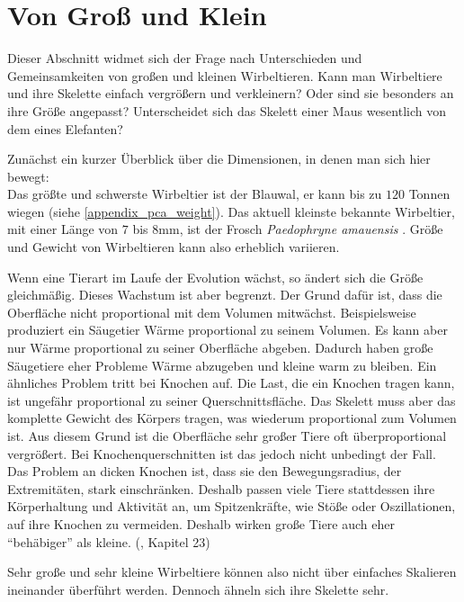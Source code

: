 \section{Von Groß und Klein}
\label{bigAndSmall}

Dieser Abschnitt widmet sich der Frage nach Unterschieden und Gemeinsamkeiten von großen und kleinen Wirbeltieren. Kann man Wirbeltiere und ihre Skelette einfach vergrößern und verkleinern? Oder sind sie besonders an ihre Größe angepasst? Unterscheidet sich das Skelett einer Maus wesentlich von dem eines Elefanten?

Zunächst ein kurzer Überblick über die Dimensionen, in denen man sich hier bewegt:\\
Das größte und schwerste Wirbeltier ist der Blauwal, er kann bis zu $120$ Tonnen wiegen (siehe \ref{appendix_pca_weight}). Das aktuell kleinste bekannte Wirbeltier, mit einer Länge von $7$ bis $8$mm, ist der Frosch \emph{Paedophryne amauensis} \cite{smallestVertebrate}. Größe und Gewicht von Wirbeltieren kann also erheblich variieren.

Wenn eine Tierart im Laufe der Evolution wächst, so ändert sich die Größe gleichmäßig. Dieses Wachstum ist aber begrenzt. Der Grund dafür ist, dass die Oberfläche nicht proportional mit dem Volumen mitwächst. Beispielsweise produziert ein Säugetier Wärme proportional zu seinem Volumen. Es kann aber nur Wärme proportional zu seiner Oberfläche abgeben. Dadurch haben große Säugetiere eher Probleme Wärme abzugeben und kleine warm zu bleiben.
Ein ähnliches Problem tritt bei Knochen auf. Die Last, die ein Knochen tragen kann, ist ungefähr proportional zu seiner Querschnittsfläche. Das Skelett muss aber das komplette Gewicht des Körpers tragen, was wiederum proportional zum Volumen ist.
Aus diesem Grund ist die Oberfläche sehr großer Tiere oft überproportional vergrößert.  Bei Knochenquerschnitten ist das jedoch nicht unbedingt der Fall. Das Problem an dicken Knochen ist, dass sie den Bewegungsradius, \zb der Extremitäten, stark einschränken. Deshalb passen viele Tiere stattdessen ihre Körperhaltung und Aktivität an, um Spitzenkräfte, wie Stöße oder Oszillationen, auf ihre Knochen zu vermeiden. Deshalb wirken große Tiere auch eher "`behäbiger"' als kleine. (\cite{Vergleichende_Anatomie}, Kapitel 23)

Sehr große und sehr kleine Wirbeltiere können also nicht über einfaches Skalieren ineinander überführt werden. Dennoch ähneln sich ihre Skelette sehr.


